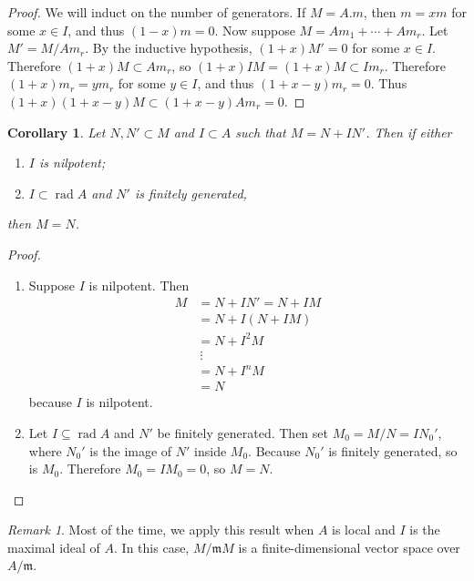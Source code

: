 \documentclass[leqno, openany]{memoir}
\newtheorem{cor}[thm]{Corollary}
\theoremstyle{definition}
\theoremstyle{remark}
\newtheorem{rmk}[thm]{Remark}
\theoremstyle{plain}
\theoremstyle{definition}
\theoremstyle{remark}
\newcommand{\mf}[1]{\mathfrak{#1}}
\begin{document}
\begin{proof}
    We will induct on the number of generators. If $M = A.m$, then $m = xm$ for some $x \in I$, and thus $(1-x)m = 0$. Now suppose $M = Am_1 + \cdots + Am_r$. Let $M' = M / Am_r$. By the inductive hypothesis, $(1+x)M' = 0$ for some $x \in I$.  Therefore $(1+x)M \subset A m_r$, so $(1+x) IM = (1+x)M \subset I m_r$. Therefore $(1+x) m_r = y m_r$ for some $y \in I$, and thus $(1+x - y) m_r = 0$. Thus $(1+x)(1+x-y) M \subset (1+x-y)A m_r = 0$.
\end{proof}

\begin{cor}
    Let $N, N' \subset M$ and $I \subset A$ such that $M = N + I N'$. Then if either
    \begin{enumerate}
        \item $I$ is nilpotent;
        \item $I \subset \operatorname{rad} A$ and $N'$ is finitely generated,
    \end{enumerate}
    then $M = N$.
\end{cor}

\begin{proof}
    \begin{enumerate}
        \item Suppose $I$ is nilpotent. Then
            \begin{align*}
                M &= N + IN' = N+IM \\
                  &= N + I (N + IM) \\
                  &= N + I^2 M \\
                  &\ \vdots \\
                  &= N + I^n M \\
                  &= N
            \end{align*}
            because $I$ is nilpotent.
        \item Let $I \subseteq \operatorname{rad} A$ and $N'$ be finitely generated. Then set $M_0 = M/N = I N_0'$, where $N_0'$ is the image of $N'$ inside $M_0$. Because $N_0'$ is finitely generated, so is $M_0$. Therefore $M_0 = I M_0 = 0$, so $M = N$.
    \end{enumerate}
\end{proof}

\begin{rmk}
    Most of the time, we apply this result when $A$ is local and $I$ is the maximal ideal of $A$. In this case, $M / \mf{m} M$ is a finite-dimensional vector space over $A / \mf{m}$.
\end{rmk}
\end{document}
